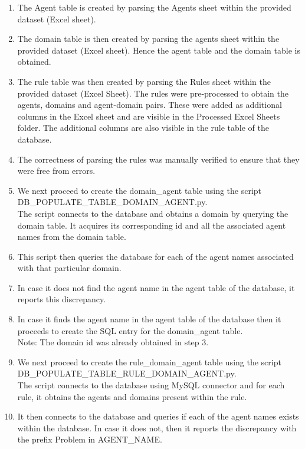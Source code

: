 \documentclass[msc,deptreport,ai]{infthesis}      %
\begin{document}
\begin{enumerate}
	\item The Agent table is created by parsing the Agents sheet within the provided dataset (Excel sheet).
	\item The domain table is then created by parsing the agents sheet within the provided dataset (Excel sheet). Hence the agent table and the domain table is obtained.
	\item The rule table was then created by parsing the Rules sheet within the provided dataset (Excel Sheet). The rules were pre-processed to obtain the agents, domains and agent-domain pairs. These were added as additional columns in the Excel sheet and are visible in the Processed Excel Sheets folder. The additional columns are also visible in the rule table of the database.
	\item The correctness of parsing the rules was manually verified to ensure that they were free from errors. 
	\item We next proceed to create the domain\_agent table using the script\\ DB\_POPULATE\_TABLE\_DOMAIN\_AGENT.py.\\ The script connects to the database and obtains a domain by querying the domain table. It acquires its corresponding id and all the associated agent names from the domain table. 
	\item This script then queries the database for each of the agent names associated with that particular domain. 
	\item In case it does not find the agent name in the agent table of the database, it reports this discrepancy.
	\item In case it finds the agent name in the agent table of the database then it proceeds to create the SQL entry for the domain\_agent table.\\ Note: The domain id was already obtained in step 3. 
	\item We next proceed to create the rule\_domain\_agent table using the script\\ DB\_POPULATE\_TABLE\_RULE\_DOMAIN\_AGENT.py.\\ The script connects to the database using MySQL connector and for each rule, it obtains the agents and domains present within the rule.
	\item  It then connects to the database and queries if each of the agent names exists within the database. In case it does not, then it reports the discrepancy with the prefix Problem in AGENT\_NAME. 

\end{enumerate}
\end{document}
